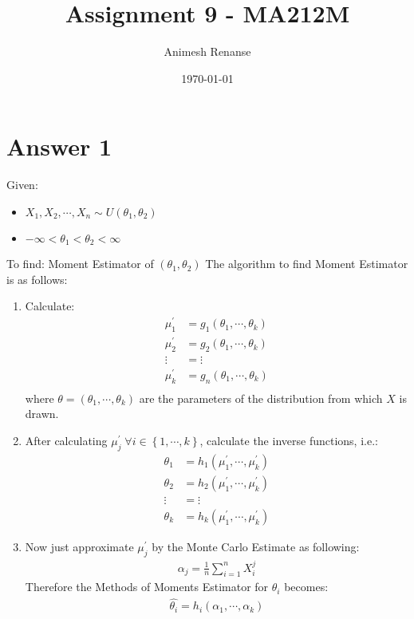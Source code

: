 \documentclass[a4paper]{article}
\title{Assignment 9 - MA212M}
\author{Animesh Renanse}
\date{\today}
\begin{document}
\maketitle
\newpage

\section{Answer 1}
Given:
\begin{itemize}
	\item {$X_1,X_2,\cdots,X_n \sim U\left( \theta_1,\theta_2 \right) $}
	\item{$-\infty<\theta_1<\theta_2<\infty$}
\end{itemize}
To find: Moment Estimator of $\left( \theta_1,\theta_2 \right) $ 
\newline\newline
The algorithm to find Moment Estimator is as follows:
\begin{enumerate}
	\item {Calculate:
		\begin{equation*}
			\begin{split}
				\mu_1^{\prime} &= g_1\left( \theta_1,\cdots,\theta_k \right) \\
				\mu_2^{\prime} &= g_2\left( \theta_1,\cdots,\theta_k \right) \\
				\vdots &= \vdots\\
				\mu_k^{\prime} &= g_n\left( \theta_1,\cdots,\theta_k \right) \\
			\end{split}
		\end{equation*}
where $\theta = \left( \theta_1,\cdots,\theta_k \right) $ are the parameters of the distribution from which $X$ is drawn.
		}
	\item{After calculating $\mu_j^{\prime}\; \forall i \in  \left\{ 1,\cdots,k \right\}$, calculate the inverse functions, i.e.:
		\begin{equation*}
			\begin{split}
				\theta_1 &=  h_1\left( \mu_1^{\prime},\cdots, \mu_k^{\prime} \right) \\
				\theta_2 &= h_2\left( \mu_1^{\prime},\cdots,\mu_k^{\prime}\right) \\
				\vdots &= \vdots\\
				\theta_k &= h_k\left( \mu_1^{\prime},\cdots,\mu_k^{\prime} \right) 
			\end{split}
		\end{equation*}
		} 
	\item{Now just approximate $\mu_j^{\prime}$ by the Monte Carlo Estimate as following:
		\begin{equation*}
			\begin{split}
				\alpha_j = \frac{1}{n} \sum_{i=1}^{n} X_i^{j}
			\end{split}
		\end{equation*}
		Therefore the Methods of Moments Estimator for $\theta_i$ becomes:
		\begin{equation*}
			\begin{split}
				\hat{\theta_i} = h_i\left( \alpha_1,\cdots,\alpha_k \right) 
			\end{split}
		\end{equation*}
		}
\end{enumerate}
\end{document}
